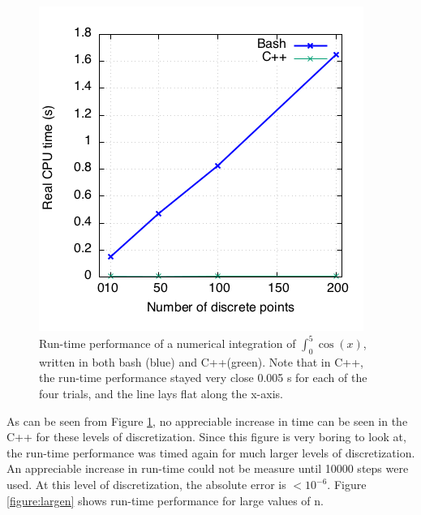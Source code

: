 \documentclass{article}
\begin{document}
  \begin{figure}[H]
  \begin{center}
  \includegraphics[scale=0.4]{Exc2.2/times_vs_numPoints.png}
  \caption{\small{Run-time performance of a numerical integration of $\int_0^5\cos(x)$, written in both bash (blue) and C++(green). Note that in C++, the run-time performance stayed very close 0.005 s for each of the four trials, and the line lays flat along the x-axis.}}
  \label{fig:run-times}
  \end{center}
  \end{figure}
  
  As can be seen from Figure \ref{fig:run-times}, no appreciable increase in time can be seen in the C++ for these levels of discretization. Since this figure is very boring to look at, the run-time performance was timed again for much larger levels of discretization. An appreciable increase in run-time could not be measure until 10000 steps were used. At this level of discretization, the absolute error is $< 10^{-6}$. Figure \ref{figure:largen} shows run-time performance for large values of n. 
  
\end{document}
